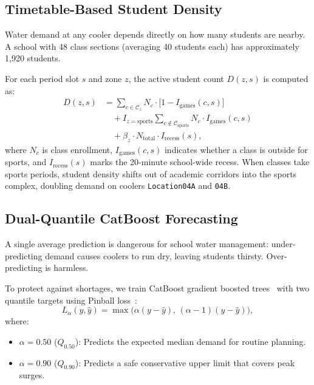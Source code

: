 \documentclass[conference]{IEEEtran}
\begin{document}
\subsection{Timetable-Based Student Density}
Water demand at any cooler depends directly on how many students are nearby. A school with 48 class sections (averaging 40 students each) has approximately 1,920 students.

For each period slot $s$ and zone $z$, the active student count $D(z, s)$ is computed as:
\begin{equation}
\begin{split}
D(z, s) &= \sum_{c \in \mathcal{C}_z} N_c \cdot \big[1 - I_{\text{games}}(c, s)\big] \\
&\quad + I_{z = \text{sports}} \sum_{c \notin \mathcal{C}_{\text{sports}}} N_c \cdot I_{\text{games}}(c, s) \\
&\quad + \beta_z \cdot N_{\text{total}} \cdot I_{\text{recess}}(s),
\end{split}
\end{equation}
where $N_c$ is class enrollment, $I_{\text{games}}(c, s)$ indicates whether a class is outside for sports, and $I_{\text{recess}}(s)$ marks the 20-minute school-wide recess. When classes take sports periods, student density shifts out of academic corridors into the sports complex, doubling demand on coolers \texttt{Location04A} and \texttt{04B}.

\subsection{Dual-Quantile CatBoost Forecasting}
A single average prediction is dangerous for school water management: under-predicting demand causes coolers to run dry, leaving students thirsty. Over-predicting is harmless.

To protect against shortages, we train CatBoost gradient boosted trees~\cite{prokhorenkova2018catboost} with two quantile targets using Pinball loss~\cite{koenker1978regression}:
\begin{equation}
L_\alpha(y, \hat{y}) = \max\Big(\alpha(y - \hat{y}),\, (\alpha - 1)(y - \hat{y})\Big),
\end{equation}
where:
\begin{itemize}
    \item $\alpha = 0.50$ ($Q_{0.50}$): Predicts the expected median demand for routine planning.
    \item $\alpha = 0.90$ ($Q_{0.90}$): Predicts a safe conservative upper limit that covers peak surges.
\end{itemize}
\end{document}
